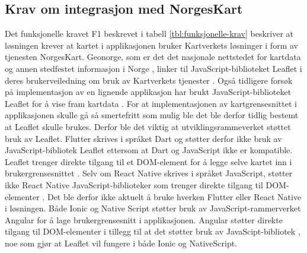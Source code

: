 \subsection{Krav om integrasjon med NorgesKart}
Det funksjonelle kravet F1 beskrevet i tabell \ref{tbl:funksjonelle-krav} beskriver at løsningen krever at kartet i applikasjonen bruker Kartverkets løsninger i form av tjenesten NorgesKart. Geonorge, som er det det nasjonale nettstedet for kartdata og annen stedfestet informasjon i Norge \cite{OmGeonorge}, linker til JavaScript-biblioteket Leaflet \cite{LeafletJavaScriptLibrary} i deres brukerveiledning om bruk av Kartverkets tjenester \cite{GeoNorgeLeaflet}. Også tidligere forsøk på implementasjon av en lignende applikasjon har brukt JavaScript-biblioteket Leaflet for å vise fram kartdata \cite[~s.116]{dystheEffektiviseringAvManuell2018}. For at implementasjonen av kartgrensesnittet i applikasjonen skulle gå så smertefritt som mulig ble det ble derfor tidlig bestemt at Leaflet skulle brukes. Derfor ble det viktig at utviklingsrammeverket støttet bruk av Leaflet. Flutter skrives i språket Dart \cite{FlutterDart} og støtter derfor ikke bruk av JavaScript-bibliotek Leaflet ettersom at Dart og JavaScript ikke er kompatible. Leaflet trenger direkte tilgang til et DOM-element \cite{IntroductionDOMWeb} for å legge selve kartet inn i brukergrensesnittet \cite{LeafletDom}. Selv om React Native skrives i språket JavaScript, støtter ikke React Native JavaScript-biblioteker som trenger direkte tilgang til DOM-elementer \cite{JavaScriptLibraryReactNative}. Det ble derfor ikke aktuelt å bruke hverken Flutter eller React Native i løsningen. Både Ionic og Native Script støtter bruk av JavaScript-rammerverket Angular \cite{IonicAngularOverview, NativeScriptAngular} for å lage brukergrensesnitt i applikasjonen. Angular støtter direkte tilgang til DOM-elementer \cite{AngularElementRef} i tillegg til at det støtter bruk av JavaScipt-bibliotek \cite{AngularJavaScriptLibraries}, noe som gjør at Leaflet vil fungere i både Ionic og NativeScript.

